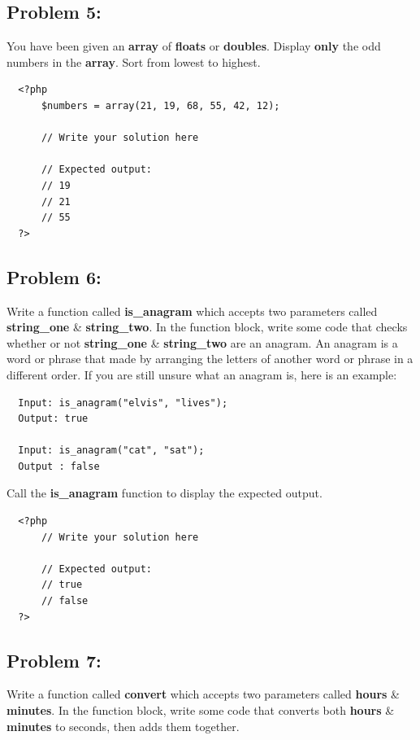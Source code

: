 \documentclass{article}
\begin{document}
\subsection*{Problem 5:}
You have been given an \textbf{array} of \textbf{floats} or \textbf{doubles}. Display \textbf{only} the odd numbers in the \textbf{array}. Sort from lowest to highest.

\begin{verbatim}
  <?php  
      $numbers = array(21, 19, 68, 55, 42, 12);
      
      // Write your solution here

      // Expected output:
      // 19
      // 21
      // 55
  ?>
\end{verbatim}

\subsection*{Problem 6:}
Write a function called \textbf{is\_anagram} which accepts two parameters called \textbf{string\_one} \& \textbf{string\_two}. In the function block, write some code that checks whether or not \textbf{string\_one} \& \textbf{string\_two} are an anagram. An anagram is a word or phrase that made by arranging the letters of another word or phrase in a different order. If you are still unsure what an anagram is, here is an example:

\begin{verbatim}
  Input: is_anagram("elvis", "lives");
  Output: true

  Input: is_anagram("cat", "sat");
  Output : false
\end{verbatim}

Call the \textbf{is\_anagram} function to display the expected output.

\begin{verbatim}
  <?php  
      // Write your solution here

      // Expected output:
      // true
      // false
  ?>
\end{verbatim}

\subsection*{Problem 7:}
Write a function called \textbf{convert} which accepts two parameters called \textbf{hours} \& \textbf{minutes}. In the function block, write some code that converts both \textbf{hours} \& \textbf{minutes} to seconds, then adds them together.
\end{document}
